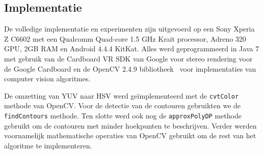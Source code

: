 %
%
%
%

\subsection{Implementatie}
De volledige implementatie en experimenten zijn uitgevoerd op een Sony Xperia Z C6602 met een Qualcomm Quad-core 1.5 GHz Krait processor, Adreno 320 GPU, 2GB RAM en Android 4.4.4 KitKat. Alles werd geprogrammeerd in Java 7 met gebruik van de Cardboard VR SDK van Google voor stereo rendering voor de Google Cardboard en de OpenCV 2.4.9 bibliotheek~\cite{opencv} voor implementaties van computer vision algoritmes.

De omzetting van YUV naar HSV werd ge\"implementeerd met de \texttt{cvtColor} methode van OpenCV. Voor de detectie van de contouren gebruikten we de \texttt{findContours} methode. Ten slotte werd ook nog de \texttt{approxPolyDP} methode gebruikt om de contouren met minder hoekpunten te beschrijven. Verder werden voornamelijk mathematische operaties van OpenCV gebruikt om de rest van het algoritme te implementeren.

